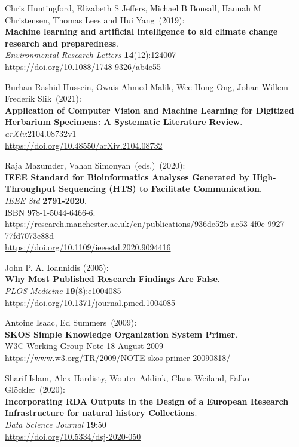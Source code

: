 \begin{thebibliography}{9}
Chris Huntingford, Elizabeth S Jeffers, Michael B Bonsall, Hannah M Christensen, Thomas Lees and Hui Yang~(2019): \\
\textbf{Machine learning and artificial intelligence to aid climate change research and preparedness}.\\
\emph{Environmental Research Letters} \textbf{14}(12):124007\\
\url{https://doi.org/10.1088/1748-9326/ab4e55}

Burhan Rashid Hussein, Owais Ahmed Malik, Wee-Hong Ong, Johan Willem Frederik Slik~(2021): \\
\textbf{Application of Computer Vision and Machine Learning for Digitized Herbarium Specimens: A Systematic Literature Review}.\\
\emph{arXiv}:2104.08732v1\\
\url{https://doi.org/10.48550/arXiv.2104.08732}

Raja Mazumder, Vahan Simonyan~(eds.)~(2020): \\
\textbf{IEEE Standard for Bioinformatics Analyses Generated by High-Throughput Sequencing (HTS) to Facilitate Communication}.\\
\emph{IEEE Std} \textbf{2791-2020}.\\
ISBN 978-1-5044-6466-6.\\
\url{https://research.manchester.ac.uk/en/publications/936de52b-ac53-4f0e-9927-77fd7073e88d}\\
\url{https://doi.org/10.1109/ieeestd.2020.9094416}

John P. A. Ioannidis (2005): \\
\textbf{Why Most Published Research Findings Are False}. \\
\emph{PLOS Medicine} \textbf{19}(8):e1004085 \\
\url{https://doi.org/10.1371/journal.pmed.1004085}

Antoine Isaac, Ed Summers~(2009): \\
\textbf{SKOS Simple Knowledge Organization System Primer}. \\
W3C Working Group Note 18 August 2009 \\
\url{https://www.w3.org/TR/2009/NOTE-skos-primer-20090818/}

Sharif Islam, Alex Hardisty, Wouter Addink, Claus Weiland, Falko Glöckler~(2020): \\
\textbf{Incorporating RDA Outputs in the Design of a European Research Infrastructure for natural history Collections}.\\
\emph{Data Science Journal} \textbf{19}:50\\
\url{https://doi.org/10.5334/dsj-2020-050}


\end{thebibliography}
